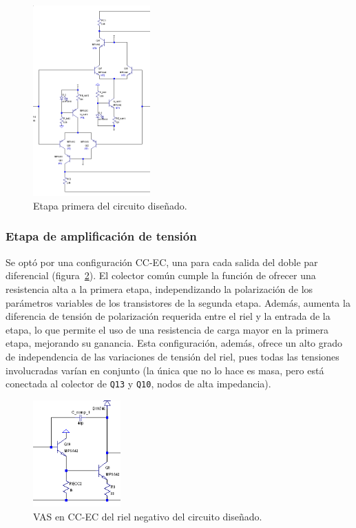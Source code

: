 \documentclass[a4paper,12pt,twoside]{article}
\begin{document}
\begin{figure}[H]
\centering
\includegraphics[width=0.4\textwidth]{img/etapa-1}
\caption{Etapa primera del circuito diseñado.}
\label{fig:etapa-1} 
\end{figure}



\subsubsection{Etapa de amplificación de tensión}

Se optó por una configuración CC-EC, una para cada salida del doble par diferencial (figura~\ref{fig:vas-1}). El colector común cumple la función de ofrecer una resistencia alta a la primera etapa, independizando la polarización de los parámetros variables de los transistores de la segunda etapa. Además, aumenta la diferencia de tensión de polarización requerida entre el riel y la entrada de la etapa, lo que permite el uso de una resistencia de carga mayor en la primera etapa, mejorando su ganancia. Esta configuración, además, ofrece un alto grado de independencia de las variaciones de tensión del riel, pues todas las tensiones involucradas varían en conjunto (la única que no lo hace es masa, pero está conectada al colector de \texttt{Q13} y \texttt{Q10}, nodos de alta impedancia). 


\begin{figure}[H]
\centering
\includegraphics[width=0.3\textwidth]{img/sim/vas-1}
\caption{VAS en CC-EC del riel negativo del circuito diseñado.}
\label{fig:vas-1} 
\end{figure}
\end{document}
